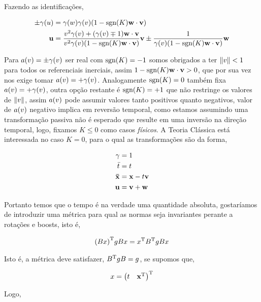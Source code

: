 \documentclass[twoside]{amsart}
\newcommand{\sgn}[1]{\mbox{sgn}\qty(#1)}
\numberwithin{equation}{section}
\begin{document}
Fazendo as identificações,

\begin{align}
    \pm\gamma\qty(u)&=\gamma\qty(w)\gamma\qty(v)\qty(1-\sgn K\vb w\cdot \vb v)\\
    \vb u &=\frac{v^2\gamma\qty(v)+\qty(\gamma\qty(v)\mp1)\vb w\cdot\vb v}{v^2\gamma\qty(v)\qty(1-\sgn K\vb w\cdot\vb v)}\vb v\pm\frac{1}{\gamma\qty(v)\qty(1-\sgn K \vb w\cdot \vb v)}\vb w
\end{align}

Para $a\qty(v)=\pm\gamma\qty(v)$ ser real com $\sgn K=-1$ somos obrigados a ter $\norm{v}< 1$ para todos os referenciais inerciais, assim $1-\sgn K \vb w\cdot \vb v>0$, que por sua vez nos exige tomar $a\qty(v)=+\gamma\qty(v)$. Analogamente $\sgn K=0$ também fixa $a\qty(v)=+\gamma\qty(v)$, outra opção restante é $\sgn K=+1$ que não restringe os valores de $\norm{v}$, assim $a\qty(v)$ pode assumir valores tanto positivos quanto negativos, valor de $a\qty(v)$ negativo implica em reversão temporal, como estamos assumindo uma transformação passiva não é esperado que resulte em uma inversão na direção temporal, logo, fixamos $K\leq 0$ como casos \emph{físicos}. A Teoria Clássica está interessada no caso $K=0$, para o qual as transformações são da forma,

\begin{align}
    \gamma&=1\\
    {\bar t}&=t\\
    \vb {\bar x}&=\vb x- t\vb v\\
    \vb u&=\vb v+\vb w
\end{align}

Portanto temos que o tempo é na verdade uma quantidade absoluta, gostaríamos de introduzir uma métrica para qual as normas seja invariantes perante a rotações e boosts, isto é,

\begin{align*}
    \qty(Bx)^{\textup T}gBx=x^{\textup T}B^\textup{T}gBx
\end{align*}

Isto é, a métrica deve satisfazer, $B^{\textup T}gB=g$, se supomos que,

\begin{align*}
    x=\mqty(t&\vb x^{\textup T})^{\textup T}
\end{align*}    

Logo,
\end{document}
